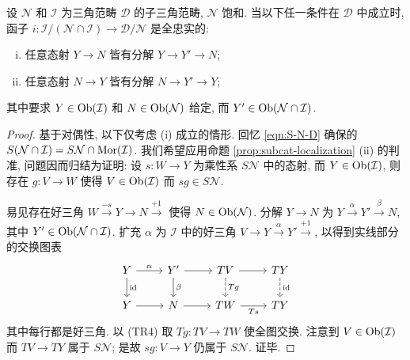 \begin{lemma}\label{prop:N-D-full-faithful}
	设 $\mathcal{N}$ 和 $\mathcal{I}$ 为三角范畴 $\mathcal{D}$ 的子三角范畴, $\mathcal{N}$ 饱和. 当以下任一条件在 $\mathcal{D}$ 中成立时, 函子 $i: \mathcal{I}/(\mathcal{N} \cap \mathcal{I}) \to \mathcal{D}/\mathcal{N}$ 是全忠实的:
	\begin{enumerate}[(i)]
		\item 任意态射 $Y \to N$ 皆有分解 $Y \to Y' \to N$;
		\item 任意态射 $N \to Y$ 皆有分解 $N \to Y' \to Y$;
	\end{enumerate}
	其中要求 $Y \in \operatorname{Ob}(\mathcal{I})$ 和 $N \in \operatorname{Ob}(\mathcal{N})$ 给定, 而 $Y' \in \operatorname{Ob}(\mathcal{N} \cap \mathcal{I})$.
\end{lemma}
\begin{proof}
	基于对偶性, 以下仅考虑 (i) 成立的情形. 回忆 \eqref{eqn:S-N-D} 确保的 $S(\mathcal{N} \cap \mathcal{I}) = S\mathcal{N} \cap \operatorname{Mor}(\mathcal{I})$. 我们希望应用命题 \ref{prop:subcat-localization} (ii) 的判准, 问题因而归结为证明: 设 $s: W \to Y$ 为乘性系 $S\mathcal{N}$ 中的态射, 而 $Y \in \operatorname{Ob}(\mathcal{I})$, 则存在 $g: V \to W$ 使得 $V \in \operatorname{Ob}(\mathcal{I})$ 而 $sg \in S\mathcal{N}$.
	
	易见存在好三角 $W \xrightarrow{-s} Y \to N \xrightarrow{+1}$ 使得 $N \in \operatorname{Ob}(\mathcal{N})$. 分解 $Y \to N$ 为 $Y \xrightarrow{\alpha} Y' \xrightarrow{\beta} N$, 其中 $Y' \in \operatorname{Ob}(\mathcal{N} \cap \mathcal{I})$. 扩充 $\alpha$ 为 $\mathcal{I}$ 中的好三角 $V \to Y \xrightarrow{\alpha} Y' \xrightarrow{+1}$, 以得到实线部分的交换图表
	\[\begin{tikzcd}
		Y \arrow[r, "\alpha"] \arrow[d, "\identity"] & Y' \arrow[d, "\beta"] \arrow[r] & TV \arrow[r] \arrow[dashed, d, "Tg"] & TY \arrow[d, dashed, "\identity"] \\
		Y \arrow[r] & N \arrow[r] & TW \arrow[r, "Ts"'] & TY 
	\end{tikzcd}\]
	其中每行都是好三角. 以 (TR4) 取 $Tg: TV \to TW$ 使全图交换. 注意到 $V \in \operatorname{Ob}(\mathcal{I})$ 而 $TV \to TY$ 属于 $S\mathcal{N}$; 是故 $sg: V \to Y$ 仍属于 $S\mathcal{N}$. 证毕.
\end{proof}

